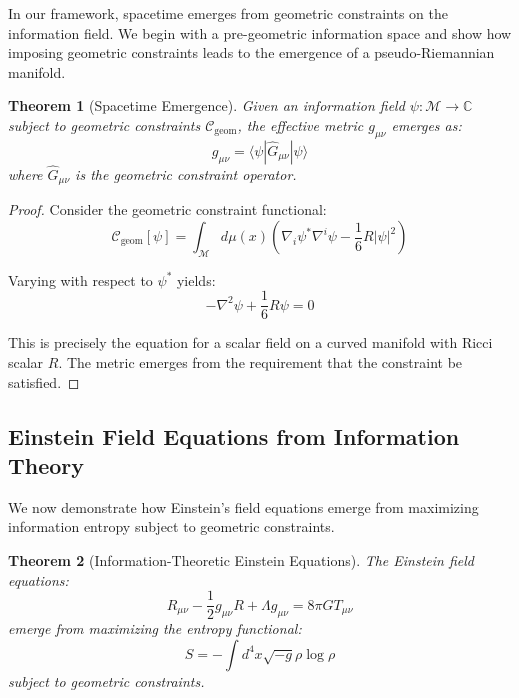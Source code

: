 \documentclass[11pt,a4paper]{article}
\newtheorem{theorem}{Theorem}
\begin{document}
In our framework, spacetime emerges from geometric constraints on the information field. We begin with a pre-geometric information space and show how imposing geometric constraints leads to the emergence of a pseudo-Riemannian manifold.

\begin{theorem}[Spacetime Emergence]
Given an information field $\psi: \mathcal{M} \to \mathbb{C}$ subject to geometric constraints $\mathcal{C}_{\text{geom}}$, the effective metric $g_{\mu\nu}$ emerges as:
\begin{equation}
g_{\mu\nu} = \langle \psi | \hat{G}_{\mu\nu} | \psi \rangle
\end{equation}
where $\hat{G}_{\mu\nu}$ is the geometric constraint operator.
\end{theorem}

\begin{proof}
Consider the geometric constraint functional:
\begin{equation}
\mathcal{C}_{\text{geom}}[\psi] = \int_{\mathcal{M}} d\mu(x) \left( \nabla_i \psi^* \nabla^i \psi - \frac{1}{6} R |\psi|^2 \right)
\end{equation}

Varying with respect to $\psi^*$ yields:
\begin{equation}
-\nabla^2 \psi + \frac{1}{6} R \psi = 0
\end{equation}

This is precisely the equation for a scalar field on a curved manifold with Ricci scalar $R$. The metric emerges from the requirement that the constraint be satisfied.
\end{proof}

\subsection{Einstein Field Equations from Information Theory}

We now demonstrate how Einstein's field equations emerge from maximizing information entropy subject to geometric constraints.

\begin{theorem}[Information-Theoretic Einstein Equations]
The Einstein field equations:
\begin{equation}
R_{\mu\nu} - \frac{1}{2} g_{\mu\nu} R + \Lambda g_{\mu\nu} = 8\pi G T_{\mu\nu}
\end{equation}
emerge from maximizing the entropy functional:
\begin{equation}
S = -\int d^4x \sqrt{-g} \rho \log \rho
\end{equation}
subject to geometric constraints.
\end{theorem}
\end{document}
